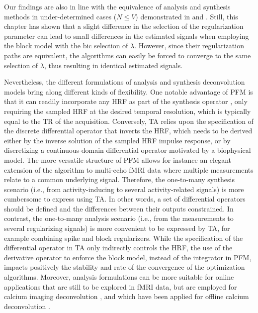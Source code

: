 Our findings are also in line with the equivalence of analysis and synthesis
methods in under-determined cases (\(N \leq V\)) demonstrated in
\citep{Elad2007Analysisversussynthesis} and
\citep{Ortelli2019Synthesisanalysistotal}. Still, this chapter has shown that a
slight difference in the selection of the regularization parameter can lead to
small differences in the estimated signals when employing the block model with
the \acrshort*{bic} selection of $\lambda$. However, since their regularization
paths are equivalent, the algorithms can easily be forced to converge to the
same selection of $\lambda$, thus resulting in identical estimated signals.

Nevertheless, the different formulations of analysis and synthesis deconvolution
models bring along different kinds of flexibility. One notable advantage of PFM
is that it can readily incorporate any HRF as part of the synthesis operator
\citep{Elad2007Analysisversussynthesis}, only requiring the sampled HRF at the
desired temporal resolution, which is typically equal to the TR of the
acquisition. Conversely, TA relies upon the specification of the discrete
differential operator that inverts the HRF, which needs to be derived either by
the inverse solution of the sampled HRF impulse response, or by discretizing a
continuous-domain differential operator motivated by a biophysical model. The
more versatile structure of PFM allows for instance an elegant extension of the
algorithm to multi-echo fMRI data
\citep{CaballeroGaudes2019deconvolutionalgorithmmulti} where multiple
measurements relate to a common underlying signal. Therefore, the one-to-many
synthesis scenario (i.e., from activity-inducing to several activity-related
signals) is more cumbersome to express using TA. In other words, a set of
differential operators should be defined and the differences between their
outputs constrained. In contrast, the one-to-many analysis scenario (i.e., from
the measurements to several regularizing signals) is more convenient to be
expressed by TA, for example combining spike and block regularizers. While the
specification of the differential operator in TA only indirectly controls the
HRF, the use of the derivative operator to enforce the block model, instead of
the integrator in PFM, impacts positively the stability and rate of the
convergence of the optimization algorithms. Moreover, analysis formulations can
be more suitable for online applications that are still to be explored in fMRI
data, but are employed for calcium imaging deconvolution
\citep{Friedrich2017Fastonlinedeconvolution,Jewell2019Fastnonconvexdeconvolution},
and which have been applied for offline calcium deconvolution
\citep{Farouj2020DeconvolutionSustainedNeural}.

